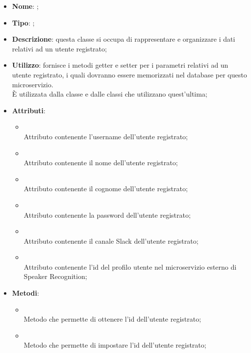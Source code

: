 \begin{itemize}
	\item \textbf{Nome}: ;
	\item \textbf{Tipo}: ;
	\item \textbf{Descrizione}: questa classe si occupa di rappresentare e organizzare i dati relativi ad un utente registrato;
	\item \textbf{Utilizzo}: fornisce i metodi getter e setter per i parametri relativi ad un utente registrato, i quali dovranno essere memorizzati nel database per questo microservizio.\\
È utilizzata dalla classe  e dalle classi che utilizzano quest'ultima;
	\item \textbf{Attributi}:
	\begin{itemize}
		\item[]  \\
		Attributo contenente l'username dell'utente registrato;
		\item[]  \\
		Attributo contenente il nome dell'utente registrato;
		\item[]  \\
		Attributo contenente il cognome dell'utente registrato;
		\item[]  \\
		Attributo contenente la password dell'utente registrato;
		\item[]  \\
		Attributo contenente il canale Slack dell'utente registrato;
		\item[]  \\
		Attributo contenente l'id del profilo utente nel microservizio esterno di Speaker Recognition;
	\end{itemize}
	\item \textbf{Metodi}:
	\begin{itemize}
		\item[]  \\
		Metodo che permette di ottenere l'id dell'utente registrato;\\
		\item[]  \\
		Metodo che permette di impostare l'id dell'utente registrato;\\

\end{itemize}
\end{itemize}
